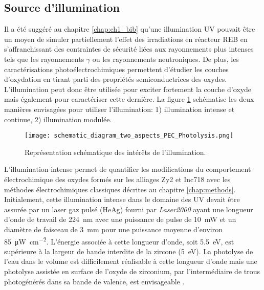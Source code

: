 \begin{refsection}
\section{Source d’illumination}\label{sec:ch3_UV_sources}

    Il a été suggéré au chapitre \ref{chap:ch1_bib} qu'une illumination UV pouvait être un moyen de simuler
    partiellement l’effet des irradiations en réacteur REB
    en s’affranchissant des contraintes de sécurité liées aux rayonnements plus intenses tels que les rayonnements
    $\gamma$
    ou les rayonnements neutroniques. 
    De plus, les caractérisations photoélectrochimiques permettent d'étudier les couches
    d'oxydation en tirant parti des propriétés semiconductrices des oxydes.
    L'illumination peut donc être utilisée pour exciter fortement la couche d'oxyde mais également pour caractériser
    cette dernière.
    La figure \ref{fig:ch3_UV_sources_use} schématise les deux manières envisagées pour utiliser l'illumination:
    1) illumination intense et continue, 2) illumination modulée. 
    
    \begin{figure}[H]
		\centering
		\texttt{[image: schematic\_diagram\_two\_aspects\_PEC\_Photolysis.png]}
		\caption{Représentation schématique des intérêts de l'illumination.}
		\label{fig:ch3_UV_sources_use}
	\end{figure}

    
    L'illumination intense permet de quantifier les modifications du
    comportement électrochimique des oxydes formés sur les alliages Zy2 et Inc718 avec les méthodes électrochimiques
    classiques décrites au chapitre \ref{chap:methods}.   
    Initialement, cette illumination intense dans le domaine des UV devait être assurée par un laser gaz pulsé (HeAg)
    fourni par \emph{Laser2000} 
    ayant une longueur d’onde de travail de \SI{224}{\nano\meter} avec une puissance de pulse de \SI{10}{\milli\watt}
    et un diamètre de faisceau de \SI{3}{\milli\meter} pour une puissance moyenne d'environ
    \SI{85}{\micro\watt\per\square\centi\meter}. 
    L’énergie associée à cette longueur d'onde, soit \SI{5.5}{\electronvolt}, est supérieure à la largeur
    de bande interdite de la zircone (\SI{5}{\electronvolt}).
    La photolyse de l’eau dans le volume est difficilement réalisable à 
    cette longueur d’onde \citep{Mozumder2002} mais une photolyse assistée en surface 
    de l’oxyde de zirconium, par l'intermédiaire de trous photogénérés dans sa bande de valence, est envisageable
    \citep{Takahashi2006, Petrik2001}.
    

\end{refsection}
